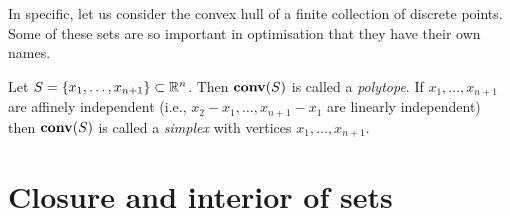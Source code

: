 In specific, let us consider the convex hull of a finite collection of discrete points. Some of these sets are so important in optimisation that they have their own names. 
%
\begin{definition}
Let $S = \left\{ x_1, \dots, x_{n+1} \right \} \subset \mathbb{R}^n$. Then $\mathop{\bf conv}(S)$ is called a \emph{polytope}. If $x_1,\dots,x_{n+1}$ are affinely independent (i.e., $x_2 - x_1, \dots ,x_{n+1} - x_1$ are linearly independent) then $\mathop{\bf conv}(S)$ is called a \emph{simplex} with vertices $x_1,\dots,x_{n+1}$.
\end{definition}
%


%
%
%
%
%


\section{Closure and interior of sets}

